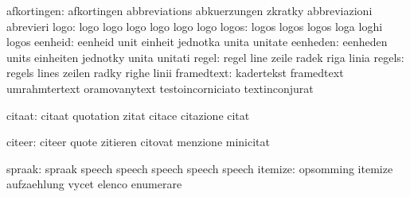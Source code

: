               afkortingen: afkortingen               abbreviations
                           abkuerzungen              zkratky
                           abbreviazioni             abrevieri
                     logo: logo                      logo
                           logo                      logo
                           logo                      logo
                    logos: logos                     logos
                           logos                     loga
                           loghi                     logos
                  eenheid: eenheid                   unit
                           einheit                   jednotka
                           unita                     unitate
                 eenheden: eenheden                  units
                           einheiten                 jednotky
                           unita                     unitati
                    regel: regel                     line
                           zeile                     radek
                           riga                      linia
                   regels: regels                    lines
                           zeilen                    radky
                           righe                     linii
               framedtext: kadertekst                framedtext
                           umrahmtertext             oramovanytext
                           testoincorniciato         textinconjurat

                   citaat: citaat                    quotation
                           zitat                     citace
                           citazione                 citat

                   citeer: citeer                    quote
                           zitieren                  citovat
                           menzione                  minicitat

                   spraak: spraak                    speech
                           speech                    speech
                           speech                    speech
                  itemize: opsomming                 itemize
                           aufzaehlung               vycet
                           elenco                    enumerare

\stopvariables



